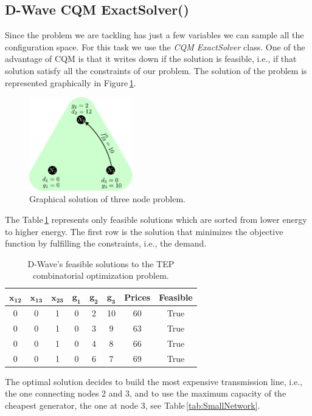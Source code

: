 \subsection{D-Wave CQM ExactSolver()}
Since the problem we are tackling has just a few variables we can sample all the configuration space. For this task we use the \textit{CQM ExactSolver} class. One of the advantage of CQM is that it writes down if the solution is feasible, i.e.,  if that solution satisfy all the constraints of our problem. The solution of the problem is represented graphically in Figure\,\ref{fig: Green_final}.
\begin{figure}[H]
  \begin{center}
\includegraphics[width=0.4\textwidth]{Figures/Green_Final.pdf}
  \end{center}
  \caption{Graphical solution of three node problem.}
  \label{fig: Green_final}
\end{figure}
The Table\,\ref{tab:SmallNetworkResults} represents only feasible solutions which are sorted from lower energy to higher energy. The first row is the solution that minimizes the objective function by fulfilling the constraints, i.e., the demand.
 \begin{table}[H]
\centering
\begin{tabular}{ |c|c|c|c|c|c|c|c| }
  \hline			
  $\mathbf{x_{12}}$ & $\mathbf{x_{13}}$ & $\mathbf{x_{23}}$ & $\mathbf{g_{1}}$ & $\mathbf{g_{2}}$ & $\mathbf{g_{3}}$ & \textbf{Prices} & \textbf{Feasible} \\
  \hline
    0 & 0 & 1 & 0 & 2 & 10 & 60 & True \\
  \hline
    0 & 0 & 1 & 0 & 3 & 9 & 63 & True \\
  \hline
    0 & 0 & 1 & 0 & 4 & 8 & 66 & True \\
  \hline
    0 & 0 & 1 & 0 & 6 & 7 & 69 & True \\
  \hline
\end{tabular}
\caption{D-Wave's feasible solutions to the TEP combinatorial optimization problem.}
\label{tab:SmallNetworkResults}
\end{table}
The optimal solution decides to build the most expensive transmission line, i.e., the one connecting nodes 2 and 3, and to use the maximum capacity of the cheapest generator, the one at node 3, see Table\,\ref{tab:SmallNetwork}.
